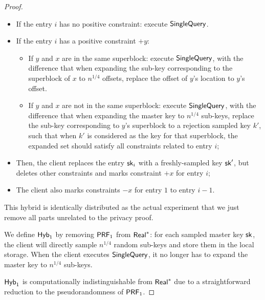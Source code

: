 \begin{proof}
\begin{itemize}
\begin{itemize}
            \item If the entry $i$ has no positive constraint: execute $\mathsf{SingleQuery}$.
            
            \item If the entry $i$ has a positive constraint $+y$:
            \begin{itemize}
                \item If $y$ and $x$ are in the same superblock: execute $\mathsf{SingleQuery}$, with the difference that when expanding the sub-key corresponding to the superblock of $x$ to $n^{1/4}$ offsets, replace the offset of $y$'s location to $y$'s offset.
                
                \item If $y$ and $x$ are not in the same superblock: execute $\mathsf{SingleQuery}$, with the difference that when expanding the master key to $n^{1/4}$ sub-keys, replace the sub-key corresponding to $y$'s superblock to a rejection sampled key $k'$, such that when $k'$ is considered as the key for that superblock, the expanded set should satisfy all constraints related to entry $i$;
            \end{itemize}
            
            \item Then, the client replaces the entry $\mathsf{sk}_i$ with a freshly-sampled key $\mathsf{sk}'$, but deletes other constraints and marks constraint $+x$ for entry $i$;
            
            \item The client also marks constraints $-x$ for entry $1$ to entry $i-1$.
            
        \end{itemize}
        
    \end{itemize}
    
    This hybrid is identically distributed as the actual experiment that we just remove all parts unrelated to the privacy proof.
    
    
    We define ${\sf Hyb}_1$ by removing $\mathsf{PRF}_1$ from ${\sf Real}^*$: for each sampled master key $\mathsf{sk}$, the client will directly sample $n^{1/4}$ random sub-keys and store them in the local storage. 
    When the client executes $\mathsf{SingleQuery}$, it no longer has to expand the master key to $n^{1/4}$ sub-keys. 
    
    ${\sf Hyb}_1$ is computationally indistinguishable from ${\sf Real}^*$ due to a straightforward reduction to the pseudorandomness of $\mathsf{PRF}_1$.
    

\end{proof}
